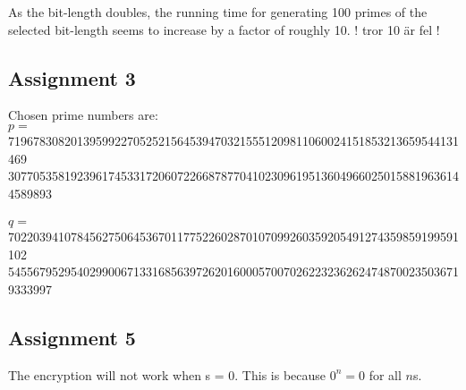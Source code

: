 \documentclass[11pt,a4paper]{article}
\begin{document}
As the bit-length doubles, the running time for generating 100 primes of the selected bit-length seems to increase by a factor of roughly 10. ! tror 10 är fel !

\subsection{Assignment 3}
Chosen prime numbers are: \\
$p = $719678308201395992270525215645394703215551209811060024151853213659544131469\\3077053581923961745331720607226687877041023096195136049660250158819636144589893\\\\
$q = $702203941078456275064536701177522602870107099260359205491274359859199591102\\5455679529540299006713316856397262016000570070262232362624748700235036719333997
\subsection{Assignment 5}

The encryption will not work when s = 0. This is because $0^n = 0$ for all $n$s.
\end{document}
